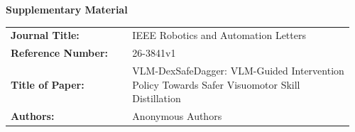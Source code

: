 \documentclass[10pt]{article}
\newcommand{\manuscriptid}{26-3841v1}
\newcommand{\papertitle}{VLM-DexSafeDagger: VLM-Guided Intervention Policy Towards Safer Visuomotor Skill Distillation}
\begin{document}
\begin{center}
  {\Large\bfseries Supplementary Material}\par
\end{center}

\vspace{0.8em}
\begin{tabular}{@{}p{0.34\linewidth}p{0.62\linewidth}@{}}
\textbf{Journal Title:} & IEEE Robotics and Automation Letters \\
\textbf{Reference Number:} & \manuscriptid \\
\textbf{Title of Paper:} & \papertitle \\
\textbf{Authors:} & Anonymous Authors
\end{tabular}

\vspace{0.8em}
\appendix

\end{document}
